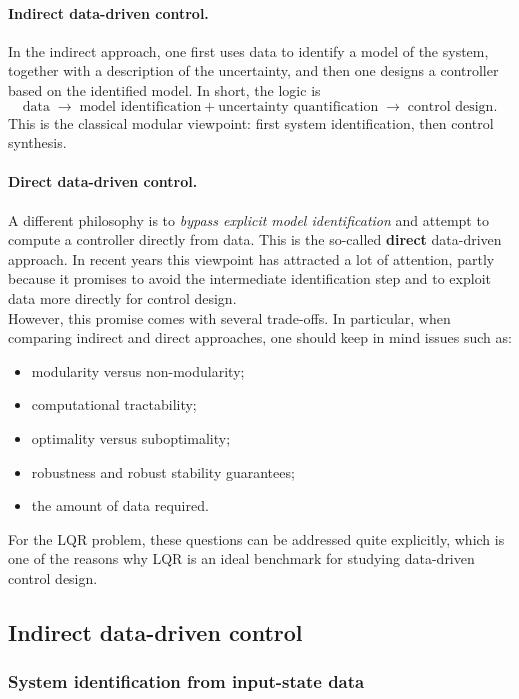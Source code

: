 \paragraph{Indirect data-driven control.}
In the indirect approach, one first uses data to identify a model of the system, together with a
description of the uncertainty, and then one designs a controller based on the identified model.
In short, the logic is
\[
\text{data} \;\longrightarrow\; \text{model identification} + \text{uncertainty quantification}
\;\longrightarrow\; \text{control design}.
\]
This is the classical modular viewpoint: first system identification, then control synthesis.

\paragraph{Direct data-driven control.}
A different philosophy is to \emph{bypass explicit model identification} and attempt to compute a
controller directly from data. This is the so-called \textbf{direct} data-driven approach. In recent
years this viewpoint has attracted a lot of attention, partly because it promises to avoid the
intermediate identification step and to exploit data more directly for control design.\\

However, this promise comes with several trade-offs. In particular, when comparing indirect and
direct approaches, one should keep in mind issues such as:
\begin{itemize}
    \item modularity versus non-modularity;
    \item computational tractability;
    \item optimality versus suboptimality;
    \item robustness and robust stability guarantees;
    \item the amount of data required.
\end{itemize}
For the LQR problem, these questions can be addressed quite explicitly, which is one of the
reasons why LQR is an ideal benchmark for studying data-driven control design.

\subsection{Indirect data-driven control}
\subsubsection{System identification from input-state data}

